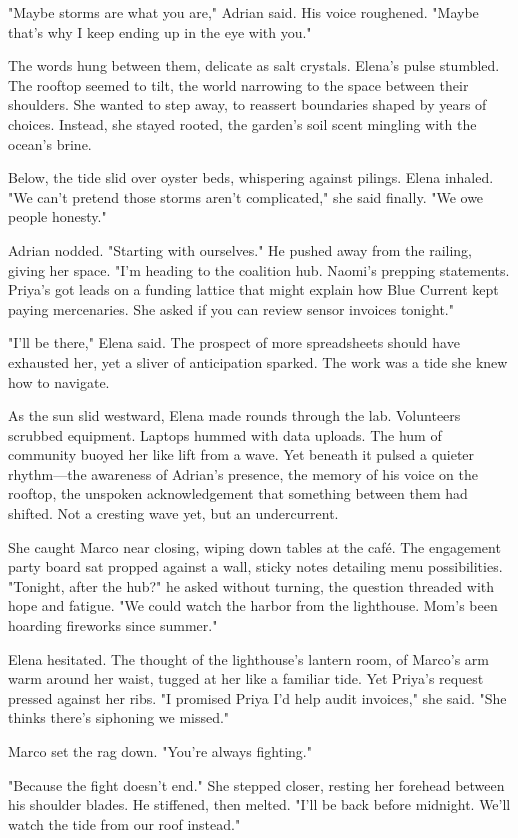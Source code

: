 "Maybe storms are what you are," Adrian said. His voice roughened. "Maybe that's why I keep ending up in the eye with you."

The words hung between them, delicate as salt crystals. Elena's pulse stumbled. The rooftop seemed to tilt, the world narrowing to the space between their shoulders. She wanted to step away, to reassert boundaries shaped by years of choices. Instead, she stayed rooted, the garden's soil scent mingling with the ocean's brine.

Below, the tide slid over oyster beds, whispering against pilings. Elena inhaled. "We can't pretend those storms aren't complicated," she said finally. "We owe people honesty."

Adrian nodded. "Starting with ourselves." He pushed away from the railing, giving her space. "I'm heading to the coalition hub. Naomi's prepping statements. Priya's got leads on a funding lattice that might explain how Blue Current kept paying mercenaries. She asked if you can review sensor invoices tonight."

"I'll be there," Elena said. The prospect of more spreadsheets should have exhausted her, yet a sliver of anticipation sparked. The work was a tide she knew how to navigate.

As the sun slid westward, Elena made rounds through the lab. Volunteers scrubbed equipment. Laptops hummed with data uploads. The hum of community buoyed her like lift from a wave. Yet beneath it pulsed a quieter rhythm—the awareness of Adrian's presence, the memory of his voice on the rooftop, the unspoken acknowledgement that something between them had shifted. Not a cresting wave yet, but an undercurrent.

She caught Marco near closing, wiping down tables at the café. The engagement party board sat propped against a wall, sticky notes detailing menu possibilities. "Tonight, after the hub?" he asked without turning, the question threaded with hope and fatigue. "We could watch the harbor from the lighthouse. Mom's been hoarding fireworks since summer."

Elena hesitated. The thought of the lighthouse's lantern room, of Marco's arm warm around her waist, tugged at her like a familiar tide. Yet Priya's request pressed against her ribs. "I promised Priya I'd help audit invoices," she said. "She thinks there's siphoning we missed."

Marco set the rag down. "You're always fighting."

"Because the fight doesn't end." She stepped closer, resting her forehead between his shoulder blades. He stiffened, then melted. "I'll be back before midnight. We'll watch the tide from our roof instead."

